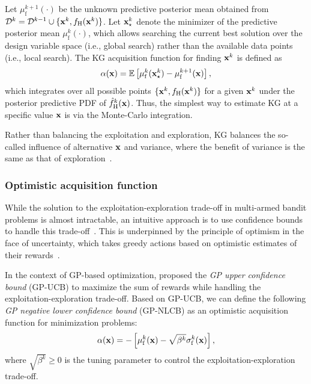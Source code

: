 \documentclass[journal ]{new-aiaa}
\begin{document}
Let $\mu_\text{f}^{k+1}({\cdot})$ be the unknown predictive posterior mean obtained from $\mathcal{D}^{k} = \mathcal{D}^{k-1} \cup \{{\bf x}^{k},f_\text{H}({\bf x}^{k})\}$.
Let ${\bf x}_{\star}^k$ denote the minimizer of the predictive posterior mean $\mu_\text{f}^k({\cdot})$, which allows searching the current best solution over the design variable space (i.e., global search) rather than the available data points (i.e., local search).
The KG acquisition function for finding ${\bf x}^k$ is defined as~\citep{Frazier2008}
\begin{equation}\label{eqn41}
	\alpha({\bf x}) = \mathbb{E}\left[\mu_\text{f}^k({\bf x}_{\star}^k)-\mu_\text{f}^{k+1}({\bf x})\right],
\end{equation}
which integrates over all possible points $\{{\bf x}^k,f_\text{H}({\bf x}^k)\}$ for a given ${\bf x}^k$ under the posterior predictive PDF of $\hat{f}_\text{H}^k({\bf x})$.
Thus, the simplest way to estimate KG at a specific value ${\bf x}$ is via the Monte-Carlo integration.

Rather than balancing the exploitation and exploration, KG balances the so-called influence of alternative ${\bf x}$ and variance, where the benefit of variance is the same as that of exploration~\citep{Frazier2008}.

\subsubsection{Optimistic acquisition function}\label{Sec512}

While the solution to the exploitation-exploration trade-off in multi-armed bandit problems is almost intractable, an intuitive approach is to use confidence bounds to handle this trade-off~\citep{Lai1985,Auer2002}.
This is underpinned by the principle of optimism in the face of uncertainty,
which takes greedy actions based on optimistic estimates of their rewards~\citep{Shahriari2016}.

In the context of GP-based optimization, \citet{Srinivas2010} proposed the \textit{GP upper confidence bound} (GP-UCB) to maximize the sum of rewards while handling the exploitation-exploration trade-off.
Based on GP-UCB, we can define the following \textit{GP negative lower confidence bound} (GP-NLCB) as an optimistic acquisition function for minimization problems:
\begin{equation}\label{eqn42}
	\alpha({\bf x}) = -\left[\mu_\text{f}^k({\bf x})-\sqrt{\beta^k} \sigma_\text{f}^k({\bf x})\right],
\end{equation}
where $\sqrt{\beta^k} \geq 0$ is the tuning parameter to control the exploitation-exploration trade-off.
\end{document}
